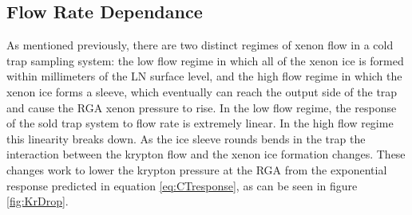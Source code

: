 \documentclass[12pt]{article}
\begin{document}
\subsection{Flow Rate Dependance}
\label{sec:flow_real}
As mentioned previously, there are two distinct regimes of xenon flow in a cold trap sampling system: the low flow regime in which all of the xenon ice is formed within millimeters of the LN surface level, and the high flow regime in which the xenon ice forms a sleeve, which eventually can reach the output side of the trap and cause the RGA xenon pressure to rise. In the low flow regime, the response of the sold trap system to flow rate is extremely linear. In the high flow regime this linearity breaks down. As the ice sleeve rounds bends in the trap the interaction between the krypton flow and the xenon ice formation changes. These changes work to lower the krypton pressure at the RGA from the exponential response predicted in equation \ref{eq:CTresponse}, as can be seen in figure \ref{fig:KrDrop}.
\end{document}
